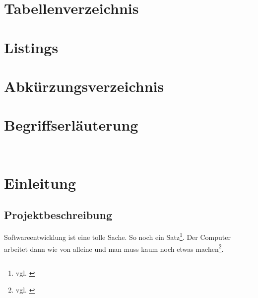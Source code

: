 \documentclass[11pt,toc=sectionentrywithoutdots, headheight=44pt, headings=optiontoheadandtoc, hyperfootnotes=false]{scrartcl}
\begin{document}
\newpage
\setcounter{page}{1}


\tableofcontents


\setcounter{secnumdepth}{0}

\newpage

\listoffigures




\newpage

\section{Tabellenverzeichnis}
\blindtext\blindtext\blindtext

\section{Listings}
\blindtext\blindtext\blindtext
\newpage

\section{Abkürzungsverzeichnis}


\begin{acronym}[xxxxxxx]


\end{acronym}

\newpage

\section{Begriffserläuterung}
\blindtext\
\newpage

\setcounter{secnumdepth}{4}

\section{Einleitung}
\blindtext\blindtext

\subsection{Projektbeschreibung}
Softwareentwicklung ist eine tolle Sache. So noch ein Satz\footnote{vgl. \cite{Gettner2015}}.
Der Computer arbeitet dann wie von alleine und man muss kaum noch etwas machen\footnote{vgl. \cite{Theis2014}}.
\end{document}
